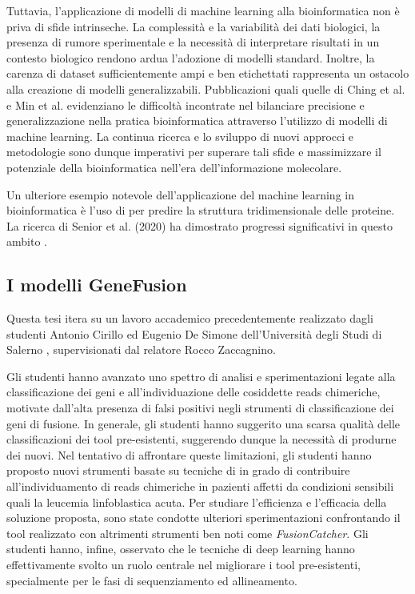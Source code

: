 Tuttavia, l'applicazione di modelli di machine learning alla bioinformatica non è priva di sfide intrinseche. La complessità e la variabilità dei dati biologici, la presenza di rumore sperimentale e la necessità di interpretare risultati in un contesto biologico rendono ardua l'adozione di modelli standard. Inoltre, la carenza di dataset sufficientemente ampi e ben etichettati rappresenta un ostacolo alla creazione di modelli generalizzabili. Pubblicazioni quali quelle di Ching et al. \cite{ching2018deep} e Min et al. \cite{min2017deep} evidenziano le difficoltà incontrate nel bilanciare precisione e generalizzazione nella pratica bioinformatica attraverso l'utilizzo di modelli di machine learning. La continua ricerca e lo sviluppo di nuovi approcci e metodologie sono dunque imperativi per superare tali sfide e massimizzare il potenziale della bioinformatica nell'era dell'informazione molecolare.

Un ulteriore esempio notevole dell'applicazione del machine learning in bioinformatica è l'uso di  per predire la struttura tridimensionale delle proteine. La ricerca di Senior et al. (2020) ha dimostrato progressi significativi in questo ambito \cite{senior2020improved}.

\subsection{I modelli GeneFusion}

Questa tesi itera su un lavoro accademico precedentemente realizzato dagli studenti Antonio Cirillo ed Eugenio De Simone dell'Università degli Studi di Salerno \cite{cirillo} \cite{desimone}, supervisionati dal relatore Rocco Zaccagnino.

Gli studenti hanno avanzato uno spettro di analisi e sperimentazioni legate alla classificazione dei geni e all'individuazione delle cosiddette reads chimeriche, motivate dall'alta presenza di falsi positivi negli strumenti di classificazione dei geni di fusione. In generale, gli studenti hanno suggerito una scarsa qualità delle classificazioni dei tool pre-esistenti, suggerendo dunque la necessità di produrne dei nuovi. Nel tentativo di affrontare queste limitazioni, gli studenti hanno proposto nuovi strumenti basate su tecniche di  in grado di contribuire all'individuamento di reads chimeriche in pazienti affetti da condizioni sensibili quali la leucemia linfoblastica acuta. Per studiare l'efficienza e l'efficacia della soluzione proposta, sono state condotte ulteriori sperimentazioni confrontando il tool realizzato con altrimenti strumenti ben noti come {\em FusionCatcher}. Gli studenti hanno, infine, osservato che le tecniche di deep learning hanno effettivamente svolto un ruolo centrale nel migliorare i tool pre-esistenti, specialmente per le fasi di sequenziamento ed allineamento.

